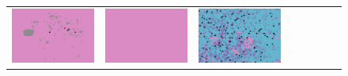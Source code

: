 \documentclass{ipol}
\begin{document}
\begin{figure}[ht]
\begin{tabular}{cccccccc}
                \includegraphics[width=\s]{images/bike/AHD/iso_64_grids.png} &
                \includegraphics[width=\s]{images/bike/DCB/iso_64_grids.png} &
                \includegraphics[width=\s]{images/bike/DHT/iso_64_grids.png} &

\end{tabular}
\end{figure}
\end{document}
